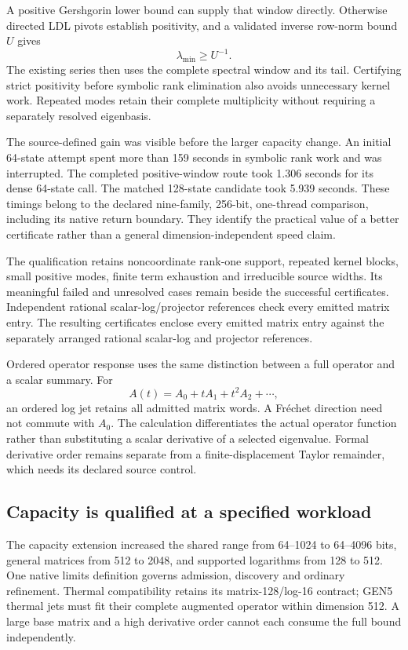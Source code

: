 A positive Gershgorin lower bound can supply that window directly. Otherwise directed LDL pivots establish positivity, and a validated inverse row-norm bound $U$ gives
\[
 \lambda_{\min}\geq U^{-1}.
\]
The existing series then uses the complete spectral window and its tail. Certifying strict positivity before symbolic rank elimination also avoids unnecessary kernel work. Repeated modes retain their complete multiplicity without requiring a separately resolved eigenbasis.

The source-defined gain was visible before the larger capacity change. An initial 64-state attempt spent more than 159 seconds in symbolic rank work and was interrupted. The completed positive-window route took 1.306 seconds for its dense 64-state call. The matched 128-state candidate took 5.939 seconds. These timings belong to the declared nine-family, 256-bit, one-thread comparison, including its native return boundary. They identify the practical value of a better certificate rather than a general dimension-independent speed claim.

The qualification retains noncoordinate rank-one support, repeated kernel blocks, small positive modes, finite term exhaustion and irreducible source widths. Its meaningful failed and unresolved cases remain beside the successful certificates. Independent rational scalar-log/projector references check every emitted matrix entry. The resulting certificates enclose every emitted matrix entry against the separately arranged rational scalar-log and projector references.

Ordered operator response uses the same distinction between a full operator and a scalar summary. For
\[
 A(t)=A_0+tA_1+t^2A_2+\cdots,
\]
an ordered log jet retains all admitted matrix words. A Fr\'echet direction need not commute with $A_0$. The calculation differentiates the actual operator function rather than substituting a scalar derivative of a selected eigenvalue. Formal derivative order remains separate from a finite-displacement Taylor remainder, which needs its declared source control.

\subsection{Capacity is qualified at a specified workload}
\label{v3-runtime-capacity}

The capacity extension increased the shared range from 64--1024 to 64--4096 bits, general matrices from 512 to 2048, and supported logarithms from 128 to 512. One native limits definition governs admission, discovery and ordinary refinement. Thermal compatibility retains its matrix-128/log-16 contract; GEN5 thermal jets must fit their complete augmented operator within dimension 512. A large base matrix and a high derivative order cannot each consume the full bound independently.

